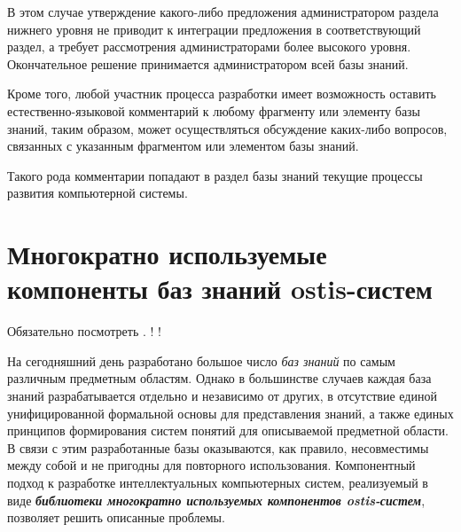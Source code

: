 В этом случае утверждение какого-либо предложения администратором раздела нижнего уровня не приводит к интеграции предложения в соответствующий раздел, а требует рассмотрения администраторами более высокого уровня. Окончательное решение принимается администратором всей базы знаний.

Кроме того, любой участник процесса разработки имеет возможность оставить естественно-языковой комментарий к любому фрагменту или элементу базы знаний, таким образом, может осуществляться обсуждение каких-либо вопросов, связанных с указанным фрагментом или элементом базы знаний. 

Такого рода комментарии попадают в раздел базы знаний текущие процессы развития компьютерной системы.



\section{Многократно используемые компоненты баз знаний ostis-систем}
\label{sc_kb_design_components}

Обязательно посмотреть . ! !

На сегодняшний день разработано большое число \textit{баз знаний} по самым различным предметным областям. Однако в большинстве случаев каждая база знаний разрабатывается отдельно и независимо от других, в отсутствие единой унифицированной формальной основы для представления знаний, а также единых принципов формирования систем понятий для описываемой предметной области. В связи с этим разработанные базы оказываются, как правило, несовместимы между собой и не пригодны для повторного использования. Компонентный подход к разработке интеллектуальных компьютерных систем, реализуемый в виде \textbf{\textit{библиотеки многократно используемых компонентов ostis-систем}}, позволяет решить описанные проблемы.

%